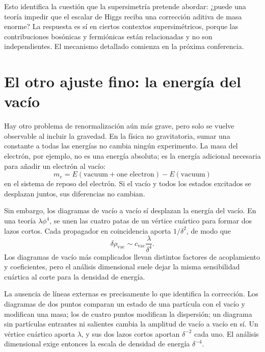 Esto identifica la cuestión que la supersimetría pretende abordar: ¿puede una teoría impedir que el escalar de Higgs reciba una corrección aditiva de masa enorme? La respuesta es sí en ciertos contextos supersimétricos, porque las contribuciones bosónicas y fermiónicas están relacionadas y no son independientes. El mecanismo detallado comienza en la próxima conferencia.

\section{El otro ajuste fino: la energía del vacío}

Hay otro problema de renormalización aún más grave, pero solo se vuelve observable al incluir la gravedad. En la física no gravitatoria, sumar una constante a todas las energías no cambia ningún experimento. La masa del electrón, por ejemplo, no es una energía absoluta; es la energía adicional necesaria para añadir un electrón al vacío:
\begin{equation}
m_e=E(\text{vacuum}+\text{one electron})-E(\text{vacuum})
\end{equation}
en el sistema de reposo del electrón. Si el vacío y todos los estados excitados se desplazan juntos, sus diferencias no cambian.

Sin embargo, los diagramas de vacío a vacío sí desplazan la energía del vacío. En una teoría \(\lambda\phi^4\), se unen las cuatro patas de un vértice cuártico para formar dos lazos cortos. Cada propagador en coincidencia aporta \(1/\delta^2\), de modo que
\begin{equation}
\delta\rho_{\mathrm{vac}}
\sim
c_{\mathrm{vac}}\frac{\lambda}{\delta^4}.
\label{eq:vacuum-energy-divergence}
\end{equation}
Los diagramas de vacío más complicados llevan distintos factores de acoplamiento y coeficientes, pero el análisis dimensional suele dejar la misma sensibilidad cuártica al corte para la densidad de energía.

La ausencia de líneas externas es precisamente lo que identifica la corrección. Los diagramas de dos puntos comparan un estado de una partícula con el vacío y modifican una masa; los de cuatro puntos modifican la dispersión; un diagrama sin partículas entrantes ni salientes cambia la amplitud de vacío a vacío en sí. Un vértice cuártico aporta \(\lambda\), y sus dos lazos cortos aportan \(\delta^{-2}\) cada uno. El análisis dimensional exige entonces la escala de densidad de energía \(\delta^{-4}\).

